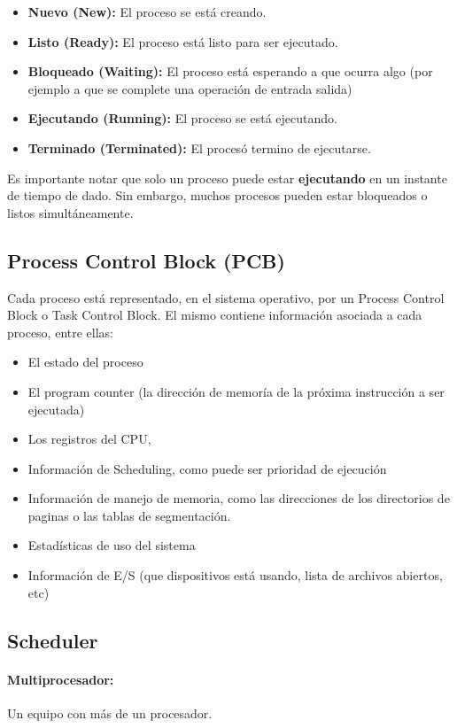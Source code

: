 \begin{itemize}
	\item \textbf{Nuevo (New):} El proceso se está creando.
	\item \textbf{Listo (Ready):} El proceso está listo para ser ejecutado.
	\item \textbf{Bloqueado (Waiting):} El proceso está esperando a que ocurra algo (por ejemplo a que se complete una operación de entrada salida)
	\item \textbf{Ejecutando (Running):} El proceso se está ejecutando.
	\item \textbf{Terminado (Terminated):} El procesó termino de ejecutarse.
\end{itemize}

Es importante notar que solo un proceso puede estar \textbf{ejecutando} en un instante de tiempo de dado. Sin embargo, muchos procesos pueden estar bloqueados o listos simultáneamente.

\subsection{Process Control Block (PCB)}\label{process::pcb}
Cada proceso está representado, en el sistema operativo, por un Process Control Block o Task Control Block. El mismo contiene información asociada a cada proceso, entre ellas:
\begin{itemize}
	\item El estado del proceso
	\item El program counter (la dirección de memoría de la próxima instrucción a ser ejecutada)
	\item Los registros del CPU,
	\item Información de Scheduling, como puede ser prioridad de ejecución
	\item Información de manejo de memoria, como las direcciones de los directorios de paginas o las tablas de segmentación.
	\item Estadísticas de uso del sistema
	\item Información de E/S (que dispositivos está usando, lista de archivos abiertos, etc)
\end{itemize}

\subsection{Scheduler}
\paragraph{Multiprocesador:} Un equipo con más de un procesador.
